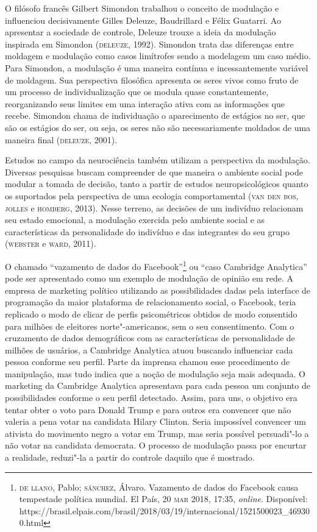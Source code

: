 O filósofo francês Gilbert Simondon trabalhou o conceito de modulação e
influenciou decisivamente Gilles Deleuze, Baudrillard e Félix Guatarri.
Ao apresentar a sociedade de controle, Deleuze trouxe a ideia da
modulação inspirada em Simondon (\textsc{deleuze}, 1992). Simondon trata das
diferenças entre moldagem e modulação como casos limítrofes sendo a
modelagem um caso médio. Para Simondon, a modulação é uma maneira
contínua e incessantemente variável de moldagem. Sua perspectiva
filosófica apresenta os seres vivos como fruto de um processo de
individualização que os modula quase constantemente, reorganizando seus
limites em uma interação ativa com as informações que recebe. Simondon
chama de individuação o aparecimento de estágios no ser, que são os
estágios do ser, ou seja, os seres não são necessariamente moldados de
uma maneira final (\textsc{deleuze}, 2001).

Estudos no campo da neurociência também utilizam a perspectiva da
modulação. Diversas pesquisas buscam compreender de que maneira o
ambiente social pode modular a tomada de decisão, tanto a partir de
estudos neuropsicológicos quanto os suportados pela perspectiva de uma
ecologia comportamental (\textsc{van den bos}, \textsc{jolles} e \textsc{homberg}, 2013). Nesse
terreno, as decisões de um indivíduo relacionam seu estado emocional, a
modulação exercida pelo ambiente social e as características da
personalidade do indivíduo e das integrantes do seu grupo (\textsc{webster} e
\textsc{ward}, 2011).

O chamado ``vazamento de dados do Facebook''\footnote{\textsc{de llano}, Pablo;
  \textsc{sánchez}, Álvaro. Vazamento de dados do Facebook causa tempestade
  política mundial. El País, 20 \textsc{mar} 2018, 17:35, \emph{online}. Disponível:
  https://brasil.elpais.com/brasil/2018/03/19/internacional/1521500023\_469300.html}
ou ``caso Cambridge Analytica'' pode ser apresentado como um exemplo de
modulação de opinião em rede. A empresa de marketing político utilizando
as possibilidades dadas pela interface de programação da maior
plataforma de relacionamento social, o Facebook, teria replicado o modo
de clicar de perfis psicométricos obtidos de modo consentido para
milhões de eleitores norte"-americanos, sem o seu consentimento. Com o
cruzamento de dados demográficos com as características de personalidade
de milhões de usuários, a Cambridge Analytica atuou buscando influenciar
cada pessoa conforme seu perfil. Parte da imprensa chamou esse
procedimento de manipulação, mas tudo indica que a noção de modulação
seja mais adequada. O marketing da Cambridge Analytica apresentava para
cada pessoa um conjunto de possibilidades conforme o seu perfil
detectado. Assim, para uns, o objetivo era tentar obter o voto para
Donald Trump e para outros era convencer que não valeria a pena votar na
candidata Hilary Clinton. Seria impossível convencer um ativista do
movimento negro a votar em Trump, mas seria possível persuadi"-lo a não
votar na candidata democrata. O processo de modulação passa por encurtar
a realidade, reduzi"-la a partir do controle daquilo que é mostrado.

